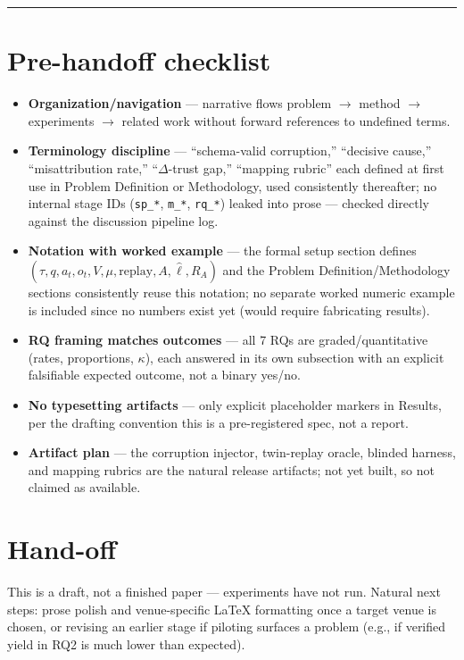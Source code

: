 \documentclass[11pt]{article}
\begin{document}
\vspace{1em}
\hrule
\vspace{1em}

\section*{Pre-handoff checklist}
\begin{itemize}[leftmargin=1.4em]
\item \textbf{Organization/navigation} --- narrative flows problem $\to$ method $\to$ experiments $\to$ related work without forward references to undefined terms.
\item \textbf{Terminology discipline} --- ``schema-valid corruption,'' ``decisive cause,'' ``misattribution rate,'' ``$\Delta$-trust gap,'' ``mapping rubric'' each defined at first use in Problem Definition or Methodology, used consistently thereafter; no internal stage IDs (\texttt{sp\_*}, \texttt{m\_*}, \texttt{rq\_*}) leaked into prose --- checked directly against the discussion pipeline log.
\item \textbf{Notation with worked example} --- the formal setup section defines $(\tau, q, a_t, o_t, V, \mu, \mathrm{replay}, A, \hat{\ell}, R_A)$ and the Problem Definition/Methodology sections consistently reuse this notation; no separate worked numeric example is included since no numbers exist yet (would require fabricating results).
\item \textbf{RQ framing matches outcomes} --- all 7 RQs are graded/quantitative (rates, proportions, $\kappa$), each answered in its own subsection with an explicit falsifiable expected outcome, not a binary yes/no.
\item \textbf{No typesetting artifacts} --- only explicit placeholder markers in Results, per the drafting convention this is a pre-registered spec, not a report.
\item \textbf{Artifact plan} --- the corruption injector, twin-replay oracle, blinded harness, and mapping rubrics are the natural release artifacts; not yet built, so not claimed as available.
\end{itemize}

\section*{Hand-off}
This is a draft, not a finished paper --- experiments have not run. Natural next steps: prose polish and venue-specific LaTeX formatting once a target venue is chosen, or revising an earlier stage if piloting surfaces a problem (e.g., if verified yield in RQ2 is much lower than expected).



\end{document}
